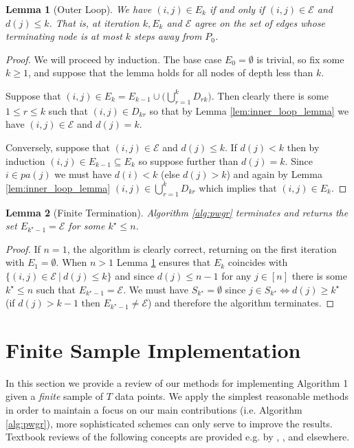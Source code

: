 \documentclass{statsoc}
\def\gcge{\mathcal{E}}  %
\newcommand{\pa}[1]{pa(#1)}  %
\newtheorem{lemma}{Lemma}
\begin{document}
\begin{lemma}[Outer Loop]
  \label{lem:outer_loop_lemma}
  We have $(i, j) \in E_k$ if and only if $(i, j) \in \gcge$ and
  $d(j) \le k$.  That is, at iteration $k, E_k$ and $\gcge$ agree on
  the set of edges whose terminating node is at most $k$ steps away
  from $P_0$.
\end{lemma}
\begin{proof}
  We will proceed by induction.  The base case $E_0 = \emptyset$ is
  trivial, so fix some $k \ge 1$, and suppose that the lemma holds for
  all nodes of depth less than $k$.

  Suppose that
  $(i, j) \in E_k = E_{k - 1}\cup \big(\bigcup_{r = 1}^k D_{rk}
  \big)$.  Then clearly there is some $1 \le r \le k$ such that
  $(i, j) \in D_{kr}$ so that by Lemma \ref{lem:inner_loop_lemma} we
  have $(i, j) \in \gcge$ and $d(j) = k$.

  Conversely, suppose that $(i, j) \in \gcge$ and $d(j) \le k$.  If
  $d(j) < k$ then by induction $(i, j) \in E_{k - 1} \subseteq E_k$ so
  suppose further than $d(j) = k$.  Since $i \in \pa{j}$ we must have
  $d(i) < k$ (else $d(j) > k$) and again by Lemma
  \ref{lem:inner_loop_lemma} $(i, j) \in \bigcup_{r = 1}^k D_{kr}$
  which implies that $(i, j) \in E_k$.
\end{proof}

\begin{lemma}[Finite Termination]
  Algorithm \ref{alg:pwgr} terminates and returns the set
  $E_{k^\star - 1} = \gcge$ for some $k^\star \le n$.
\end{lemma}
\begin{proof}
  If $n = 1$, the algorithm is clearly correct, returning on the first
  iteration with $E_1 = \emptyset$.  When $n > 1$ Lemma
  \ref{lem:outer_loop_lemma} ensures that $E_k$ coincides with
  $\{(i, j) \in \gcge\ |\ d(j) \le k\}$ and since $d(j) \le n - 1$ for
  any $j \in [n]$ there is some $k^\star \le n$ such that
  $E_{k^\star - 1} = \gcge$.  We must have $S_{k^\star} = \emptyset$
  since $j \in S_{k^\star} \iff d(j) \ge k^\star$ (if $d(j) > k - 1$ then
  $E_{k^\star - 1} \ne \gcge$) and therefore the algorithm terminates.
\end{proof}

\section{Finite Sample Implementation}
\label{sec:structure_learning}
In this section we provide a review of our methods for implementing
Algorithm 1 given a \textit{finite} sample of $T$ data points.  We
apply the simplest reasonable methods in order to maintain a focus on
our main contributions (i.e. Algorithm \ref{alg:pwgr}), more
sophisticated schemes can only serve to improve the results.  Textbook
reviews of the following concepts are provided e.g. by
\cite{all_of_statistics}, \cite{murphy_mlp}, and elsewhere.
\end{document}
